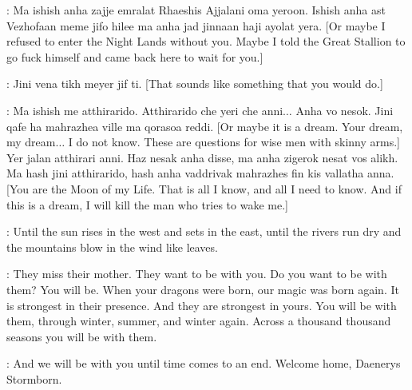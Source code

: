 \DROGO: Ma ishish anha zajje emralat Rhaeshis Ajjalani oma yeroon. Ishish anha ast Vezhofaan meme jifo hilee ma anha jad jinnaan haji ayolat yera. [Or maybe I refused to enter the Night Lands without you. Maybe I told the Great Stallion to go fuck himself and came back here to wait for you.]  

\DAENERYS: Jini vena tikh meyer jif ti. [That sounds like something that you would do.]


\DROGO: Ma ishish me atthirarido. Atthirarido che yeri che anni$\ldots$ Anha vo nesok.  Jini qafe ha mahrazhea ville ma qorasoa reddi. [Or maybe it is a dream. Your dream, my dream$\ldots$ I do not know. These are questions for wise men with skinny arms.] Yer jalan atthirari anni. Haz nesak anha disse, ma anha zigerok nesat vos alikh.  Ma hash jini atthirarido, hash anha vaddrivak mahrazhes fin kis vallatha anna. [You are the Moon of my Life. That is all I know, and all I need to know. And if this is a dream, I will kill the man who tries to wake me.] 




\DAENERYS: Until the sun rises in the west and sets in the east, until the rivers run dry and the mountains blow in the wind like leaves.

 
\PYAT: They miss their mother. They want to be with you. Do you want to be with them? You will be. When your dragons were born, our magic was born again. It is strongest in their presence. And they are strongest in yours. You will be with them, through winter, summer, and winter again. Across a thousand thousand seasons you will be with them. 


\PYAT: And we will be with you until time comes to an end. Welcome home, Daenerys Stormborn. 

